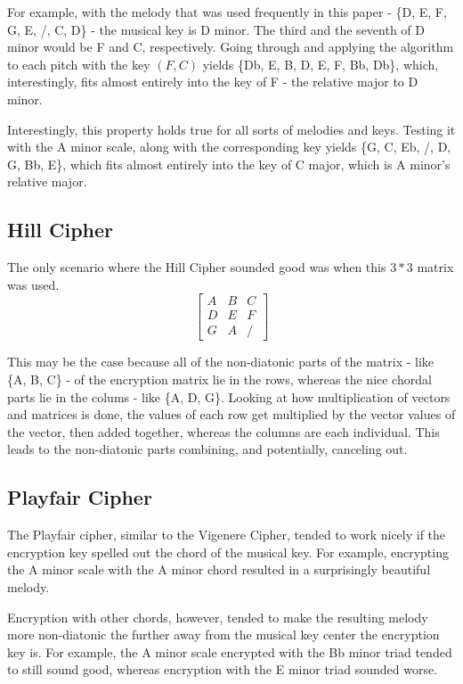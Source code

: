 \documentclass[14pt]{article}
\begin{document}
        For example, with the melody that was used frequently in this paper - \{D, E, F, G, E, /, C, D\} - the musical key is D minor. The third and the seventh of D minor would be F and C, respectively. Going through and applying the algorithm to each pitch with the key $(F, C)$ yields \{Db, E, B, D, E, F, Bb, Db\}, which, interestingly, fits almost entirely into the key of F - the relative major to D minor. 
        
        Interestingly, this property holds true for all sorts of melodies and keys. Testing it with the A minor scale, along with the corresponding key yields \{G, C, Eb, /, D, G, Bb, E\}, which fits almost entirely into the key of C major, which is A minor's relative major.

        \subsection{Hill Cipher}
        The only scenario where the Hill Cipher sounded good was when this $3 * 3$ matrix was used.
        \[
        \begin{bmatrix}
            A & B & C \\
            D & E & F \\
            G & A & /
        \end{bmatrix}
        \]

        This may be the case because all of the non-diatonic parts of the matrix - like \{A, B, C\} - of the encryption matrix lie in the rows, whereas the nice chordal parts lie in the colums - like \{A, D, G\}. Looking at how multiplication of vectors and matrices is done, the values of each row get multiplied by the vector values of the vector, then added together, whereas the columns are each individual. This leads to the non-diatonic parts combining, and potentially, canceling out.

        \subsection{Playfair Cipher}
        The Playfair cipher, similar to the Vigenere Cipher, tended to work nicely if the encryption key spelled out the chord of the musical key. For example, encrypting the A minor scale with the A minor chord resulted in a surprisingly beautiful melody.

        Encryption with other chords, however, tended to make the resulting melody more non-diatonic the further away from the musical key center the encryption key is. For example, the A minor scale encrypted with the Bb minor triad tended to still sound good, whereas encryption with the E minor triad sounded worse.
\end{document}
